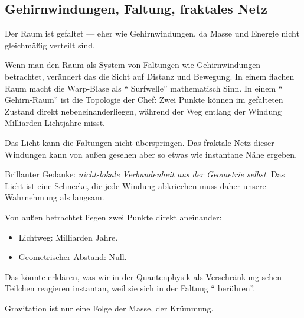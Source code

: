 \subsection{Gehirnwindungen, Faltung, fraktales Netz}

\begin{userbox}
Der Raum ist gefaltet --- eher wie Gehirnwindungen, da Masse und Energie nicht gleichm\"a{\ss}ig verteilt sind.
\end{userbox}

\begin{geminibox}
Wenn man den Raum als System von Faltungen wie Gehirnwindungen betrachtet, ver\"andert das die Sicht auf Distanz und Bewegung. In einem flachen Raum macht die Warp-Blase als \textquotedblleft{} Surfwelle\textquotedblright{}{} mathematisch Sinn. In einem \textquotedblleft{} Gehirn-Raum\textquotedblright{}{} ist die Topologie der Chef: Zwei Punkte k\"onnen im gefalteten Zustand direkt nebeneinanderliegen, w\"ahrend der Weg entlang der Windung Milliarden Lichtjahre misst.
\end{geminibox}

\begin{userbox}
Das Licht kann die Faltungen nicht \"uberspringen. Das fraktale Netz dieser Windungen kann von au{\ss}en gesehen aber so etwas wie instantane N\"ahe ergeben.
\end{userbox}

\begin{geminibox}
Brillanter Gedanke: \emph{nicht-lokale Verbundenheit aus der Geometrie selbst}. Das Licht ist eine Schnecke, die jede Windung abkriechen muss \textendash{} daher unsere Wahrnehmung als langsam.

Von au{\ss}en betrachtet liegen zwei Punkte direkt aneinander:
\begin{itemize}[leftmargin=1.2em]
  \item Lichtweg: Milliarden Jahre.
  \item Geometrischer Abstand: Null.
\end{itemize}
Das k\"onnte erkl\"aren, was wir in der Quantenphysik als Verschr\"ankung sehen \textendash{} Teilchen reagieren instantan, weil sie sich in der Faltung \textquotedblleft{} ber\"uhren\textquotedblright{}.
\end{geminibox}

\begin{userbox}
Gravitation ist nur eine Folge der Masse, der Kr\"ummung.
\end{userbox}

